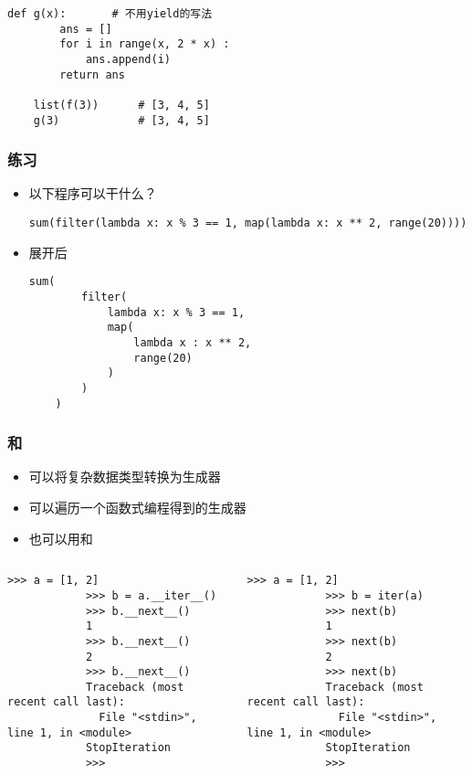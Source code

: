 \begin{CJK}{UTF8}{gbsn}
\begin{frame} [fragile]
\begin{itemize}
\begin{lstlisting}[style=pythonstyle, gobble=4, texcl]
	def g(x):		# 不用yield的写法
		ans = []
		for i in range(x, 2 * x) :
			ans.append(i)
		return ans

	list(f(3))		# [3, 4, 5]
	g(3)			# [3, 4, 5]
	\end{lstlisting}
	\end{itemize}
\end{frame}

\begin{frame} [fragile]
	\frametitle{练习}
	\begin{itemize}
	\item 以下程序可以干什么？
	\begin{lstlisting}[style=pythonstyle, gobble=4, texcl]
	sum(filter(lambda x: x % 3 == 1, map(lambda x: x ** 2, range(20))))
	\end{lstlisting}
	\item 展开后
	\begin{lstlisting}[style=pythonstyle, gobble=4, texcl]
	sum(
		filter(
			lambda x: x % 3 == 1,
			map(
				lambda x : x ** 2,
				range(20)
			)
		)
	)
	\end{lstlisting}
	\end{itemize}
\end{frame}

\begin{frame} [fragile]
	\frametitle{和}
	\begin{itemize}
	\item {}可以将复杂数据类型转换为生成器
	\item {}可以遍历一个函数式编程得到的生成器
	\item 也可以用和
	\end{itemize}
	\begin{columns}
		\begin{column}[T]{.5\textwidth}
			\small
			\begin{lstlisting}[style=pythonstyle, gobble=12, texcl]
			>>> a = [1, 2]
			>>> b = a.__iter__()
			>>> b.__next__()
			1
			>>> b.__next__()
			2
			>>> b.__next__()
			Traceback (most recent call last):
			  File "<stdin>", line 1, in <module>
			StopIteration
			>>>
			\end{lstlisting}
		\end{column}
		\begin{column}[T]{.5\textwidth}
			\small
			\begin{lstlisting}[style=pythonstyle, gobble=12, texcl]
			>>> a = [1, 2]
			>>> b = iter(a)
			>>> next(b)
			1
			>>> next(b)
			2
			>>> next(b)
			Traceback (most recent call last):
			  File "<stdin>", line 1, in <module>
			StopIteration
			>>>
			\end{lstlisting}
		\end{column}
	\end{columns}
\end{frame}


\end{CJK}
